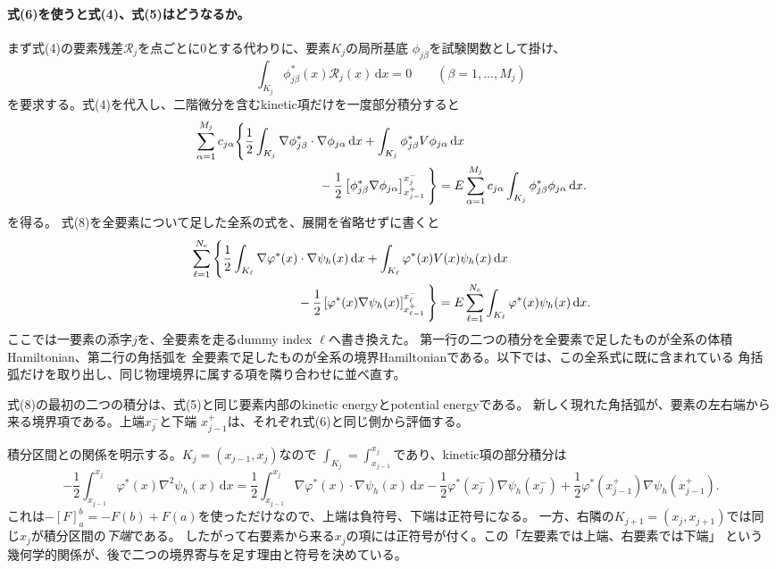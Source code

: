 \documentclass[11pt,a4paper]{article}
\newcommand{\dd}{\mathrm d}
\newcommand{\laplacian}{\nabla^2}
\begin{document}
\paragraph{式(6)を使うと式(4)、式(5)はどうなるか。}
まず式(4)の要素残差$\mathcal R_j$を点ごとに0とする代わりに、要素$K_j$の局所基底
$\phi_{j\beta}$を試験関数として掛け、
\begin{equation}
 \int_{K_j}\phi_{j\beta}^*(x)\mathcal R_j(x)\,\dd x=0
 \qquad(\beta=1,\ldots,M_j)
 \label{eq:element-residual-projection}
\end{equation}
を要求する。式(4)を代入し、二階微分を含むkinetic項だけを一度部分積分すると
\begin{align}
 &\sum_{\alpha=1}^{M_j}c_{j\alpha}\Bigg\{
 \frac12\int_{K_j}
 \nabla\phi_{j\beta}^*\cdot\nabla\phi_{j\alpha}\,\dd x
 +\int_{K_j}\phi_{j\beta}^*V\phi_{j\alpha}\,\dd x \notag\\
 &\hspace{35mm}
 -\frac12\left[\phi_{j\beta}^*\nabla\phi_{j\alpha}\right]
 _{x_{j-1}^+}^{x_j^-}\Bigg\}
 =E\sum_{\alpha=1}^{M_j}c_{j\alpha}
 \int_{K_j}\phi_{j\beta}^*\phi_{j\alpha}\,\dd x .
 \label{eq:element-weak-with-boundary}
\end{align}
を得る。
式(8)を全要素について足した全系の式を、展開を省略せずに書くと
\begin{align}
 &\sum_{\ell=1}^{N_e}\Bigg\{
 \frac12\int_{K_\ell}\nabla\varphi^*(x)\cdot\nabla\psi_h(x)\,\dd x
 +\int_{K_\ell}\varphi^*(x)V(x)\psi_h(x)\,\dd x \notag\\
 &\hspace{30mm}
 -\frac12\left[\varphi^*(x)\nabla\psi_h(x)\right]_{x_{\ell-1}^+}^{x_\ell^-}
 \Bigg\}
 =E\sum_{\ell=1}^{N_e}\int_{K_\ell}\varphi^*(x)\psi_h(x)\,\dd x .
 \label{eq:global-weak-before-regrouping}
\end{align}
ここでは一要素の添字$j$を、全要素を走るdummy index $\ell$へ書き換えた。
第一行の二つの積分を全要素で足したものが全系の体積Hamiltonian、第二行の角括弧を
全要素で足したものが全系の境界Hamiltonianである。以下では、この全系式に既に含まれている
角括弧だけを取り出し、同じ物理境界に属する項を隣り合わせに並べ直す。

式(8)の最初の二つの積分は、式(5)と同じ要素内部のkinetic energyとpotential energyである。
新しく現れた角括弧が、要素の左右端から来る境界項である。上端$x_j^-$と下端
$x_{j-1}^+$は、それぞれ式(6)と同じ側から評価する。

積分区間との関係を明示する。$K_j=(x_{j-1},x_j)$なので
$\int_{K_j}=\int_{x_{j-1}}^{x_j}$であり、kinetic項の部分積分は
\begin{equation}
 -\frac12\int_{x_{j-1}}^{x_j}\varphi^*(x)\laplacian\psi_h(x)\,\dd x
 =\frac12\int_{x_{j-1}}^{x_j}\nabla\varphi^*(x)\cdot\nabla\psi_h(x)\,\dd x
 -\frac12\varphi^*(x_j^-)\nabla\psi_h(x_j^-)
 +\frac12\varphi^*(x_{j-1}^+)\nabla\psi_h(x_{j-1}^+).
 \label{eq:ibp-with-explicit-limits}
\end{equation}
これは$-[F]_{a}^{b}=-F(b)+F(a)$を使っただけなので、上端は負符号、下端は正符号になる。
一方、右隣の$K_{j+1}=(x_j,x_{j+1})$では同じ$x_j$が積分区間の\emph{下端}である。
したがって右要素から来る$x_j$の項には正符号が付く。この「左要素では上端、右要素では下端」
という幾何学的関係が、後で二つの境界寄与を足す理由と符号を決めている。
\end{document}
